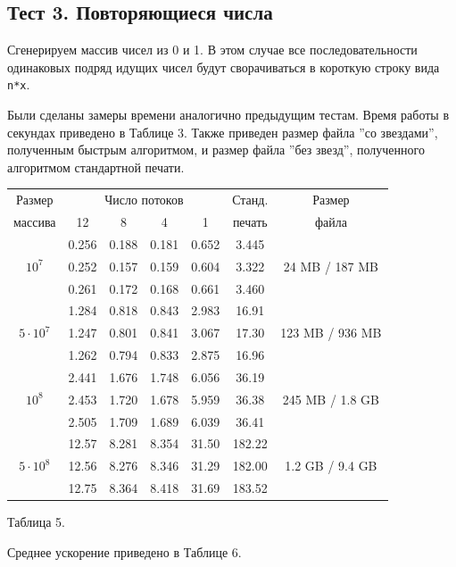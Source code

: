\subsection{Тест 3. Повторяющиеся числа}
Сгенерируем массив чисел из 0 и 1.
В этом случае все последовательности одинаковых подряд идущих чисел будут сворачиваться в короткую строку вида \texttt{n*x}.

Были сделаны замеры времени аналогично предыдущим тестам.
Время работы в секундах приведено в Таблице 3.
Также приведен размер файла ''со звездами'', полученным быстрым алгоритмом, и размер файла ''без звезд'', полученного алгоритмом стандартной печати.
\begin{center}
\begin{longtable}{||c|c|c|c|c|c|c||}
\hline
\hline
Размер & \multicolumn{4}{c|}{Число потоков} & Станд. & Размер \\
\hhline{~|-|-|-|-|~|~|}
массива & 12 & 8 & 4 & 1 & печать  & файла\\
\hline
\hline
& 0.256 & 0.188 & 0.181 & 0.652 & 3.445  &\\
\hhline{~|-|-|-|-|-|}
$10^7$ & 0.252 & 0.157 & 0.159 & 0.604 & 3.322  & 24 MB / 187 MB \\
\hhline{~|-|-|-|-|-|}
& 0.261 & 0.172 & 0.168 & 0.661 & 3.460  &\\
\hline
& 1.284 & 0.818 & 0.843 & 2.983 & 16.91  &\\
\hhline{~|-|-|-|-|-|}
$5 \cdot 10^7$ & 1.247 & 0.801 & 0.841 & 3.067 & 17.30  & 123 MB / 936 MB\\
\hhline{~|-|-|-|-|-|}
& 1.262 & 0.794 & 0.833 & 2.875 & 16.96 & \\
\hline
& 2.441 & 1.676 & 1.748 & 6.056 & 36.19 &\\
\hhline{~|-|-|-|-|-|}
$10^8$ & 2.453 & 1.720 & 1.678 & 5.959 & 36.38  & 245 MB / 1.8 GB\\
\hhline{~|-|-|-|-|-|}
& 2.505 & 1.709 & 1.689 & 6.039 &  36.41  &\\
\hline
& 12.57 & 8.281 & 8.354 & 31.50 & 182.22  &\\
\hhline{~|-|-|-|-|-|}
$5 \cdot 10^8$ & 12.56 & 8.276 & 8.346 & 31.29 & 182.00  & 1.2 GB / 9.4 GB\\
\hhline{~|-|-|-|-|-|}
& 12.75  & 8.364 & 8.418 & 31.69 & 183.52  &\\
\hline
\hline
\end{longtable}
\small{Таблица 5.}
\end{center}

Среднее ускорение приведено в Таблице 6.


